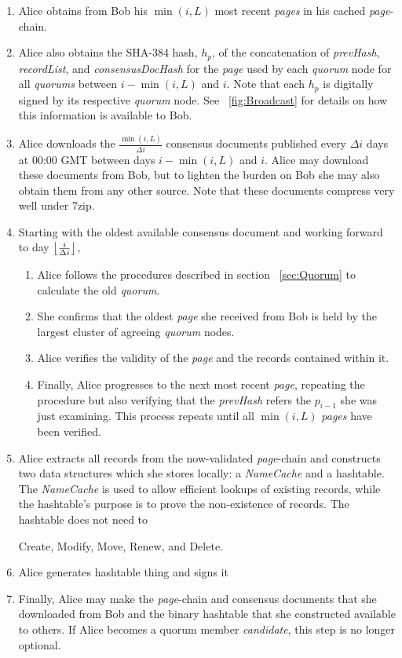 \begin{enumerate}
	\item Alice obtains from Bob his $ \min(i,L) $ most recent \emph{pages} in his cached \emph{page}-chain.
	\item Alice also obtains the SHA-384 hash, $ h_{p} $, of the concatenation of \emph{prevHash}, \emph{recordList}, and \emph{consensusDocHash} for the \emph{page} used by each \emph{quorum} node for all \emph{quorums} between $ i - \min(i,L) $ and $ i $. Note that each $ h_{p} $ is digitally signed by its respective \emph{quorum} node. See ~\ref{fig:Broadcast} for details on how this information is available to Bob.
	\item Alice downloads the $ \frac{\min(i,L)}{\Delta i} $ consensus documents published every $ \Delta i $ days at 00:00 GMT between days $ i - \min(i,L) $ and $ i $. Alice may download these documents from Bob, but to lighten the burden on Bob she may also obtain them from any other source. Note that these documents compress very well under 7zip.
	\item Starting with the oldest available consensus document and working forward to day $ \floor[\big]{\frac{i}{\Delta i}} $, 
		\begin{enumerate}
		\item Alice follows the procedures described in section ~\ref{sec:Quorum} to calculate the old \emph{quorum}.
		\item She confirms that the oldest \emph{page} she received from Bob is held by the largest cluster of agreeing \emph{quorum} nodes.
		\item Alice verifies the validity of the \emph{page} and the records contained within it.
		\item Finally, Alice progresses to the next most recent \emph{page}, repeating the procedure but also verifying that the \emph{prevHash} refers the $ p_{i - 1} $ she was just examining. This process repeats until all $ \min(i,L) $ \emph{pages} have been verified.
		\end{enumerate}
	\item Alice extracts all records from the now-validated \emph{page}-chain and constructs two data structures which she stores locally: a \emph{NameCache} and a hashtable. The \emph{NameCache} is used to allow efficient lookups of existing records, while the hashtable's purpose is to prove the non-existence of records. The hashtable does not need to 
	
	Create, Modify, Move, Renew, and Delete.
	\item Alice generates hashtable thing and signs it
	\item Finally, Alice may make the \emph{page}-chain and consensus documents that she downloaded from Bob and the binary hashtable that she constructed available to others. If Alice becomes a quorum member \emph{candidate}, this step is no longer optional.
\end{enumerate}







